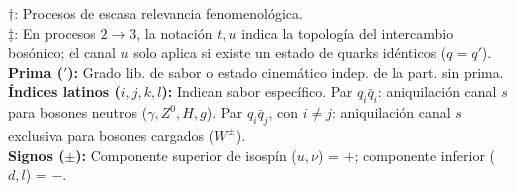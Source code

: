 {
\vspace{0.1cm}
\color{blue}$\dagger$\color{black}: Procesos de escasa relevancia fenomenológica.\\
\color{blue}$\ddagger$\color{black}: En procesos $2 \to 3$, la notación $t, u$ indica la topología del intercambio bosónico; el canal $u$ solo aplica si existe un estado de quarks idénticos ($q = q'$).\\
\textbf{Prima ($'$):} Grado lib. de sabor o estado cinemático indep. de la part. sin prima.\\
\textbf{Índices latinos ($i, j, k, l$):} Indican sabor específico. Par $q_i \bar{q}_i$: aniquilación canal $s$ para bosones neutros ($\gamma, Z^0, H, g$). Par $q_i \bar{q}_j$, con $i \neq j$: aniquilación canal $s$ exclusiva para bosones cargados ($W^\pm$).\\
\textbf{Signos ($\pm$):} Componente superior de isospín ($u, \nu$) = $+$; componente inferior ($d, l$) = $-$.

}